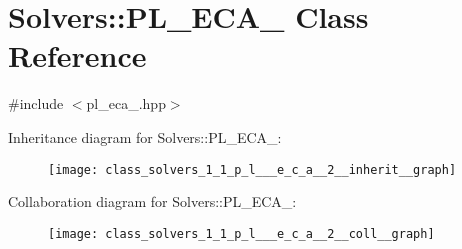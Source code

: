 \hypertarget{class_solvers_1_1_p_l___e_c_a__2}{}\section{Solvers\+:\+:P\+L\+\_\+\+E\+C\+A\+\_ Class Reference}
\label{class_solvers_1_1_p_l___e_c_a__2}


{\ttfamily \#include $<$pl\+\_\+eca\+\_.\+hpp$>$}



Inheritance diagram for Solvers\+:\+:P\+L\+\_\+\+E\+C\+A\+\_\+:\nopagebreak
\begin{figure}[H]
\begin{center}
\leavevmode
\texttt{[image: class\_solvers\_1\_1\_p\_l\_\_\_e\_c\_a\_\_2\_\_inherit\_\_graph]}
\end{center}
\end{figure}


Collaboration diagram for Solvers\+:\+:P\+L\+\_\+\+E\+C\+A\+\_\+:\nopagebreak
\begin{figure}[H]
\begin{center}
\leavevmode
\texttt{[image: class\_solvers\_1\_1\_p\_l\_\_\_e\_c\_a\_\_2\_\_coll\_\_graph]}
\end{center}
\end{figure}
